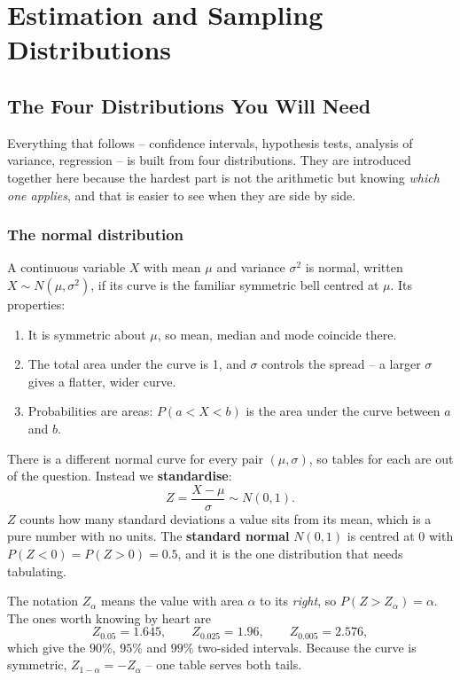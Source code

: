 \documentclass[11pt,a4paper]{article}
\theoremstyle{definition}
\begin{document}
\section{Estimation and Sampling Distributions}

\subsection{The Four Distributions You Will Need}

Everything that follows -- confidence intervals, hypothesis tests, analysis of variance,
regression -- is built from four distributions. They are introduced together here because
the hardest part is not the arithmetic but knowing \emph{which one applies}, and that is
easier to see when they are side by side.

\subsubsection{The normal distribution}

A continuous variable $X$ with mean $\mu$ and variance $\sigma^2$ is normal, written
$X\sim N(\mu,\sigma^2)$, if its curve is the familiar symmetric bell centred at $\mu$.
Its properties:
\begin{enumerate}
\item It is symmetric about $\mu$, so mean, median and mode coincide there.
\item The total area under the curve is 1, and $\sigma$ controls the spread -- a larger
$\sigma$ gives a flatter, wider curve.
\item Probabilities are areas: $P(a<X<b)$ is the area under the curve between $a$ and $b$.
\end{enumerate}

There is a different normal curve for every pair $(\mu,\sigma)$, so tables for each are out
of the question. Instead we \textbf{standardise}:
\[Z=\frac{X-\mu}{\sigma} \sim N(0,1).\]
$Z$ counts how many standard deviations a value sits from its mean, which is a pure number
with no units. The \textbf{standard normal} $N(0,1)$ is centred at 0 with
$P(Z<0)=P(Z>0)=0.5$, and it is the one distribution that needs tabulating.

The notation $Z_{\alpha}$ means the value with area $\alpha$ to its \emph{right}, so
$P(Z>Z_{\alpha})=\alpha$. The ones worth knowing by heart are
\[Z_{0.05}=1.645, \qquad Z_{0.025}=1.96, \qquad Z_{0.005}=2.576,\]
which give the $90\%$, $95\%$ and $99\%$ two-sided intervals. Because the curve is
symmetric, $Z_{1-\alpha}=-Z_{\alpha}$ -- one table serves both tails.
\end{document}
